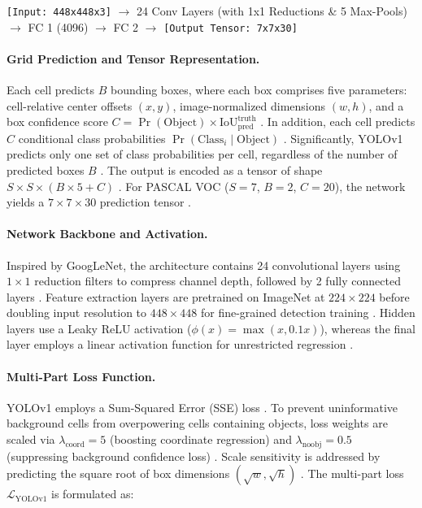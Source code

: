 \begin{center}
\texttt{[Input: 448x448x3]} $\longrightarrow$ 24 Conv Layers (with 1x1 Reductions \& 5 Max-Pools) $\longrightarrow$ FC 1 (4096) $\longrightarrow$ FC 2 $\longrightarrow$ \texttt{[Output Tensor: 7x7x30]}
\end{center}

\paragraph{Grid Prediction and Tensor Representation.}
Each cell predicts $B$ bounding boxes, where each box comprises five parameters: cell-relative center offsets $(x, y)$, image-normalized dimensions $(w, h)$, and a box confidence score $C = \Pr(\text{Object}) \times \text{IoU}_{\text{pred}}^{\text{truth}}$ \parencite[pp.~2--3]{redmon_you_2016}. In addition, each cell predicts $C$ conditional class probabilities $\Pr(\text{Class}_i \mid \text{Object})$ \parencite{redmon_you_2016}. Significantly, YOLOv1 predicts only one set of class probabilities per cell, regardless of the number of predicted boxes $B$ \parencite{redmon_you_2016}. The output is encoded as a tensor of shape $S \times S \times (B \times 5 + C)$ \parencite{redmon_you_2016}. For PASCAL VOC ($S=7$, $B=2$, $C=20$), the network yields a $7 \times 7 \times 30$ prediction tensor \parencite{redmon_you_2016}.

\paragraph{Network Backbone and Activation.}
Inspired by GoogLeNet, the architecture contains 24 convolutional layers using $1 \times 1$ reduction filters to compress channel depth, followed by 2 fully connected layers \parencite{redmon_you_2016}. Feature extraction layers are pretrained on ImageNet at $224 \times 224$ before doubling input resolution to $448 \times 448$ for fine-grained detection training \parencite{redmon_you_2016}. Hidden layers use a Leaky ReLU activation ($\phi(x) = \max(x, 0.1x)$), whereas the final layer employs a linear activation function for unrestricted regression \parencite{redmon_you_2016, ramos_yoloreview}.

\paragraph{Multi-Part Loss Function.}
YOLOv1 employs a Sum-Squared Error (SSE) loss \parencite{redmon_you_2016}. To prevent uninformative background cells from overpowering cells containing objects, loss weights are scaled via $\lambda_{\text{coord}} = 5$ (boosting coordinate regression) and $\lambda_{\text{noobj}} = 0.5$ (suppressing background confidence loss) \parencite{redmon_you_2016}. Scale sensitivity is addressed by predicting the square root of box dimensions $(\sqrt{w}, \sqrt{h})$ \parencite{redmon_you_2016}. The multi-part loss $\mathcal{L}_{\text{YOLOv1}}$ is formulated as:

